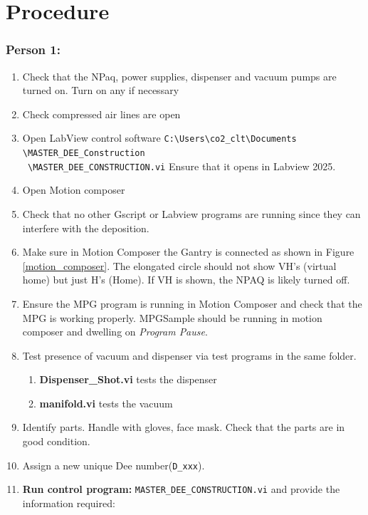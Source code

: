 \documentclass[12pt]{cornelltfpxsop}
\begin{document}
\section{Procedure}
\subsubsection*{Person 1:}
\begin{enumerate}
    \item Check that the NPaq, power supplies, dispenser and vacuum pumps are turned on. Turn on any if necessary
    \item Check compressed air lines are open
    \item Open LabView control software  \verb|C:\Users\co2_clt\Documents| \verb|\MASTER_DEE_Construction|\\ \verb| \MASTER_DEE_CONSTRUCTION.vi|
    Ensure that it opens in Labview 2025.
    \item Open Motion composer
    \item Check that no other Gscript or Labview programs are running since they can interfere with the deposition.
    \item Make sure in Motion Composer the Gantry is connected as shown in Figure \ref{motion_composer}. The elongated circle should not show VH's (virtual home) but just H's (Home). If VH is shown, the NPAQ is likely turned off.
    \item Ensure the MPG program is running in Motion Composer and check that the MPG is working properly. MPGSample should be running in motion composer and dwelling on \textit{Program Pause}.
    \item Test presence of vacuum and dispenser via test programs in the same folder. 
    \begin{enumerate}
        \item \textbf{Dispenser\_Shot.vi} tests the dispenser
        \item \textbf{manifold.vi} tests the vacuum
    \end{enumerate}
    \item Identify parts. Handle with gloves, face mask. Check that the parts are in good condition.
    \item Assign a new unique Dee number(\texttt{D\_xxx}).
    \item \textbf{Run control program:} \verb|MASTER_DEE_CONSTRUCTION.vi| and provide the information required:

\end{enumerate}
\end{document}

